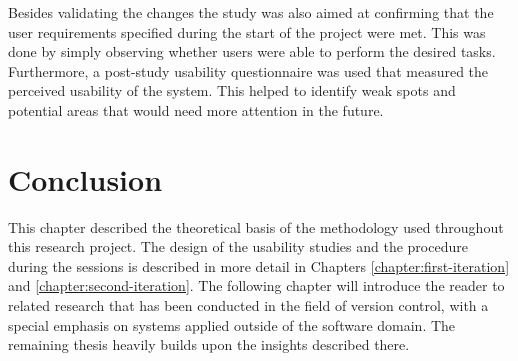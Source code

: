 Besides validating the changes the study was also aimed at confirming that the user requirements specified during the start of the project were met. This was done by simply observing whether users were able to perform the desired tasks. Furthermore, a post-study usability questionnaire was used that measured the perceived usability of the system. This helped to identify weak spots and potential areas that would need more attention in the future.



\section{Conclusion}
This chapter described the theoretical basis of the methodology used throughout this research project. The design of the usability studies and the procedure during the sessions is described in more detail in Chapters \ref{chapter:first-iteration} and \ref{chapter:second-iteration}. The following chapter will introduce the reader to related research that has been conducted in the field of version control, with a special emphasis on systems applied outside of the software domain. The remaining thesis heavily builds upon the insights described there.


